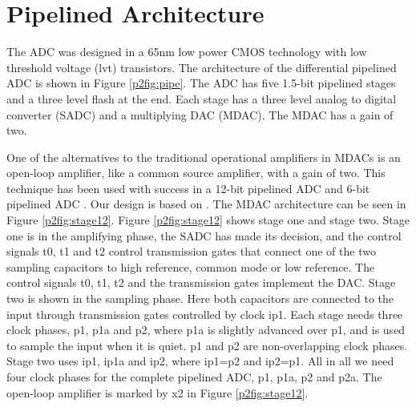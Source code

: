 \section{Pipelined Architecture}\label{p2arch}
The ADC was designed in a 65nm low power CMOS technology with low threshold
voltage (lvt) transistors. 
The architecture of the differential pipelined ADC is shown in Figure \ref{p2fig:pipe}. The ADC has
five 1.5-bit pipelined stages and a three level flash at the end. Each stage has a three level analog to
digital converter (SADC) and a multiplying DAC (MDAC). The MDAC has a gain of
two. 



One of the alternatives to the traditional operational amplifiers in MDACs is an open-loop amplifier,
like a common source amplifier, with a gain of two. This technique has
been used with success in a 12-bit pipelined ADC \cite{murmann03}
and 6-bit pipelined ADC \cite{Shen07}. Our design is based on
\cite{Shen07}. The MDAC architecture can be seen in
Figure \ref{p2fig:stage12}. Figure \ref{p2fig:stage12} shows stage one and stage
two. Stage one is in the amplifying phase, the SADC has made its
decision, and the control signals t0, t1 and t2 control transmission
gates that connect one of the two sampling capacitors to high
reference, common mode or low reference. The control signals t0, t1, t2
and the transmission gates implement the DAC. Stage two is shown
in the sampling phase. Here both capacitors are connected to the
input through transmission gates controlled by clock ip1. Each stage
needs three clock phases, p1, p1a and p2, where p1a is slightly advanced
over p1, and is used to sample the input when it is quiet. p1 and p2
are non-overlapping clock phases. Stage two uses ip1, ip1a and ip2, where
ip1=p2 and ip2=p1. All in all we need four clock phases for the
complete pipelined ADC, p1, p1a, p2 and p2a. The open-loop amplifier
is marked by x2 in Figure 
\ref{p2fig:stage12}. 


